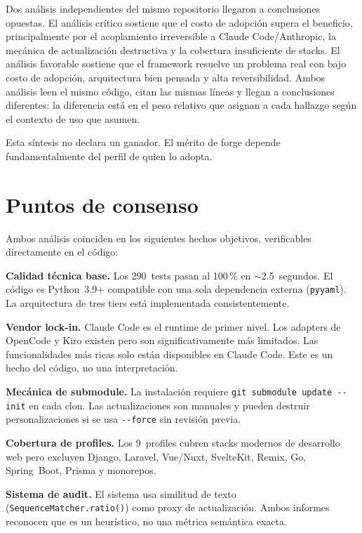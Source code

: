 \documentclass[12pt,a4paper]{article}
\begin{document}
Dos an\'alisis independientes del mismo repositorio llegaron a conclusiones opuestas. El an\'alisis cr\'itico sostiene que el costo de adopci\'on supera el beneficio, principalmente por el acoplamiento irreversible a Claude Code/Anthropic, la mec\'anica de actualizaci\'on destructiva y la cobertura insuficiente de stacks. El an\'alisis favorable sostiene que el framework resuelve un problema real con bajo costo de adopci\'on, arquitectura bien pensada y alta reversibilidad. Ambos an\'alisis leen el mismo c\'odigo, citan las mismas l\'ineas y llegan a conclusiones diferentes: la diferencia est\'a en el peso relativo que asignan a cada hallazgo seg\'un el contexto de uso que asumen.

Esta s\'intesis no declara un ganador. El m\'erito de forge depende fundamentalmente del perfil de quien lo adopta.

\section{Puntos de consenso}

Ambos an\'alisis coinciden en los siguientes hechos objetivos, verificables directamente en el c\'odigo:

\textbf{Calidad t\'ecnica base.} Los 290~tests pasan al 100\,\% en $\sim$2.5~segundos. El c\'odigo es Python~3.9+ compatible con una sola dependencia externa (\texttt{pyyaml}). La arquitectura de tres tiers est\'a implementada consistentemente.

\textbf{Vendor lock-in.} Claude Code es el runtime de primer nivel. Los adapters de OpenCode y Kiro existen pero son significativamente m\'as limitados. Las funcionalidades m\'as ricas solo est\'an disponibles en Claude Code. Este es un hecho del c\'odigo, no una interpretaci\'on.

\textbf{Mec\'anica de submodule.} La instalaci\'on requiere \texttt{git submodule update -{}-init} en cada clon. Las actualizaciones son manuales y pueden destruir personalizaciones si se usa \texttt{-{}-force} sin revisi\'on previa.

\textbf{Cobertura de profiles.} Los 9~profiles cubren stacks modernos de desarrollo web pero excluyen Django, Laravel, Vue/Nuxt, SvelteKit, Remix, Go, Spring~Boot, Prisma y monorepos.

\textbf{Sistema de audit.} El sistema usa similitud de texto (\texttt{SequenceMatcher.ratio()}) como proxy de actualizaci\'on. Ambos informes reconocen que es un heur\'istico, no una m\'etrica sem\'antica exacta.
\end{document}

